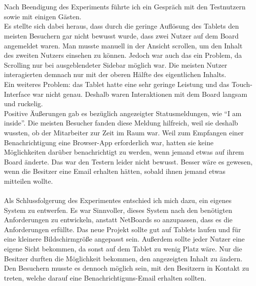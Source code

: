 \\
\\
Nach Beendigung des Experiments führte ich ein Gespräch mit den Testnutzern sowie mit einigen Gästen.
\\
Es stellte sich dabei heraus, dass durch die geringe Auflösung des Tablets den meisten Besuchern gar nicht bewusst wurde, dass zwei Nutzer auf dem Board angemeldet waren. Man musste manuell in der Ansicht scrollen, um den Inhalt des zweiten Nutzers einsehen zu können. Jedoch war auch das ein Problem, da Scrolling nur bei ausgeblendeter Sidebar möglich war. Die meisten Nutzer interagierten demnach nur mit der oberen Hälfte des eigentlichen Inhalts.
\\
Ein weiteres Problem: das Tablet hatte eine sehr geringe Leistung und das Touch-Interface war nicht genau. Deshalb waren Interaktionen mit dem Board langsam und ruckelig.
\\
Positive Äußerungen gab es bezüglich angezeigter Statusmeldungen, wie \bspw ``I am inside''. Die meisten Besucher fanden diese Meldung hilfreich, weil sie deshalb wussten, ob der Mitarbeiter zur Zeit im Raum war.
Weil zum Empfangen einer Benachrichtigung eine Browser-App erforderlich war, hatten sie keine Möglichkeiten darüber benachrichtigt zu werden, wenn jemand etwas auf ihrem Board änderte. Das war den Testern leider nicht bewusst.
Besser wäre es gewesen, wenn die Besitzer eine Email erhalten hätten, sobald ihnen jemand etwas mitteilen wollte.
\\
\\
Als Schlussfolgerung des Experimentes entschied ich mich dazu, ein eigenes System zu entwerfen.
Es war Sinnvoller, dieses System nach den benötigten Anforderungen zu entwickeln, anstatt NetBoards so anzupassen, dass es die Anforderungen erfüllte.
Das neue Projekt sollte gut auf Tablets laufen und für eine kleinere Bildschirmgröße angepasst sein.
Außerdem sollte jeder Nutzer eine eigene Sicht bekommen, da sonst auf dem Tablet zu wenig Platz wäre.
Nur die Besitzer durften die Möglichkeit bekommen, den angezeigten Inhalt zu ändern.
Den Besuchern musste es dennoch möglich sein, mit den Besitzern in Kontakt zu treten, welche darauf eine Benachrichtiguns-Email erhalten sollten.
